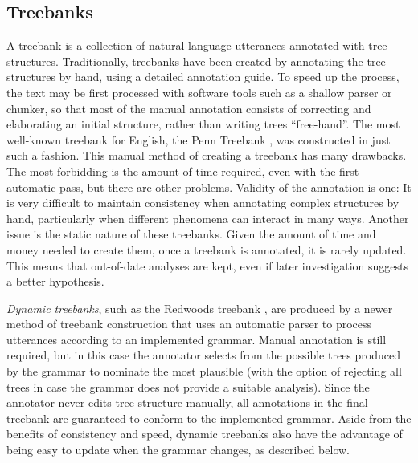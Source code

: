 \documentclass[12pt]{article}
\begin{document}



\subsection{Treebanks}
\label{sec:tb}

A treebank is a collection of natural language utterances annotated
with tree structures. Traditionally, treebanks have been created by
annotating the tree structures by hand, using a detailed annotation
guide. To speed up the process, the text may be first processed with
software tools such as a shallow parser or chunker, so that most of
the manual annotation consists of correcting and elaborating an
initial structure, rather than writing trees ``free-hand''.  The most
well-known treebank for English, the Penn Treebank
\cite{Mar:San:Mar:93}, was constructed in just such a fashion.  This
manual method of creating a treebank has many drawbacks. The most
forbidding is the amount of time required, even with the first
automatic pass, but there are other problems.  Validity of the
annotation is one: It is very difficult to maintain consistency when
annotating complex structures by hand, particularly when different
phenomena can interact in many ways. Another issue is the static
nature of these treebanks. Given the amount of time and money needed
to create them, once a treebank is annotated, it is rarely updated.
This means that out-of-date analyses are kept, even if later
investigation suggests a better hypothesis.


\textit{Dynamic treebanks}, such as the Redwoods treebank \cite{Oep:Fli:Tou:04},
are produced by a newer method of treebank construction that uses an automatic
parser to process utterances according to an implemented grammar. Manual
annotation is still required, but in this case the annotator selects from the
possible trees produced by the grammar to nominate the most plausible (with
the option of rejecting all trees in case the grammar does not provide
a suitable analysis). Since the
annotator never edits tree structure manually, all annotations in the final
treebank are guaranteed to conform to the implemented grammar.  Aside from the
benefits of consistency and speed, dynamic treebanks also have the advantage of
being easy to update when the grammar changes, as described below.
\end{document}
